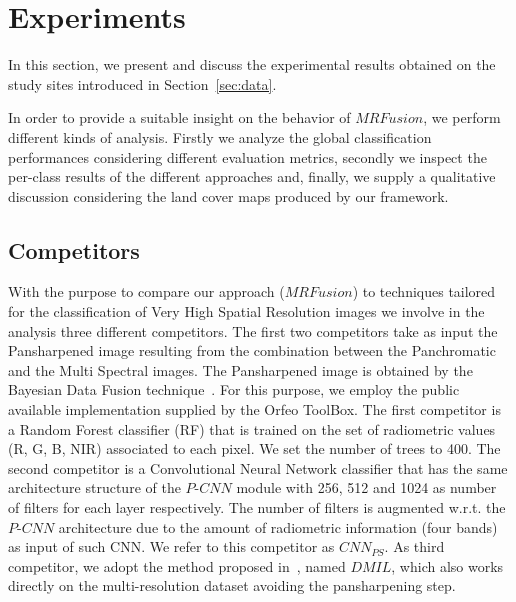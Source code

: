 \documentclass[journal]{IEEEtran}
\newcommand{\method}{$MRFusion$}
\begin{document}
\section{Experiments}
\label{sec:expe}
In this section, we present and discuss the experimental results obtained on the study sites introduced in Section~\ref{sec:data}. 

In order to provide a suitable insight on the behavior of \method, we perform different kinds of analysis. Firstly we analyze the global classification performances considering different evaluation metrics, secondly we inspect the per-class results of the different approaches and, finally, we supply a qualitative discussion considering the land cover maps produced by our framework.

\subsection{Competitors}
With the purpose to compare our approach (\method{}) to techniques tailored for the classification of Very High Spatial Resolution images we involve in the analysis three different competitors. The first two competitors take as input the Pansharpened image resulting from the combination between the Panchromatic and the Multi Spectral images. The Pansharpened image is obtained by the Bayesian Data Fusion technique~\cite{4505280}. For this purpose, we employ the public available implementation supplied by the Orfeo ToolBox\cite{Grizonnet2017}. The first competitor is a  Random Forest classifier (RF) that is trained on the set of radiometric values (R, G, B, NIR) associated to each pixel. We set the number of trees to 400. The second competitor is a Convolutional Neural Network classifier that has the same architecture structure of the $P$-$CNN$ module with 256, 512 and 1024 as number of filters for each layer respectively. The number of filters is augmented w.r.t. the $P$-$CNN$ architecture due to the amount of radiometric information (four bands) as input of such CNN. We refer to this competitor as $CNN_{PS}$. As third competitor, we adopt the method proposed in~\cite{LiuJZZZLYT18}, named $DMIL$, which also works directly on the multi-resolution dataset avoiding the pansharpening step. 
\end{document}
